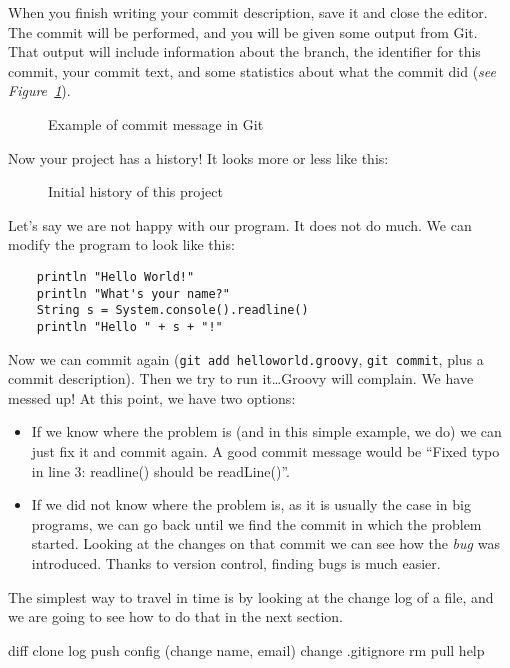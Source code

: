 When you finish writing your commit description, save it and close the
editor. The commit will be performed, and you will be given some
output from Git. That output will include information about the
branch, the identifier for this commit, your commit text, and some
statistics about what the commit did (\emph{see
  Figure~\ref{fig:git-example-1}}). 

\begin{figure}[htbp!]
  \centering
  \caption{Example of commit message in Git}
  \label{fig:git-example-1}
\end{figure}

Now your project has a history! It looks more or less like this:

\begin{figure}[htbp!]
  \centering
  \caption{Initial history of this project}
  \label{fig:git-example-2}
\end{figure}

Let's say we are not happy with our program. It does not do much. We
can modify the program to look like this:


\begin{verbatim}
    println "Hello World!"
    println "What's your name?"
    String s = System.console().readline()
    println "Hello " + s + "!"
\end{verbatim}

Now we can commit again (\verb+git add helloworld.groovy+,
\verb+git commit+, plus a commit description). Then we try to run
it\ldots Groovy will complain. We have messed up! At this point, we
have two options:

\begin{itemize}
\item If we know where the problem is (and in this simple example, we
  do) we can just fix it and commit again. A good commit message would
  be ``Fixed typo in line 3: readline() should be readLine()''.
\item If we did not know where the problem is, as it is usually the
  case in big programs, we can go back until we find the commit in
  which the problem started. Looking at the changes on that commit we
  can see how the \emph{bug} was introduced. Thanks to version
  control, finding bugs is much easier. 
\end{itemize}

The simplest way to travel in time is by looking at the change log of
a file, and we are going to see how to do that in the next section. 


diff
clone
log
push
config (change name, email)
change .gitignore
rm
pull
help




